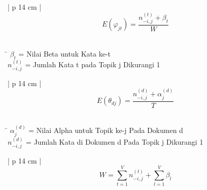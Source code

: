 {
\begin{table}[H]
\small
\centering
\begin{adjustbox}{width=1\textwidth}
\begin{tabular}{| p {14 cm} |}
\hline
{}
\begin{equation}
E(\varphi _{jt})= \dfrac{n_{-i, j}^{(t)}+ \beta_{t}}{W}
\end{equation}\\
\hline
\end{tabular}
\end{adjustbox}
\end{table}

\begin{tabbing}[H]
\= \kill
\small{\hspace{35mm}$\beta_t$ = Nilai Beta untuk Kata ke-t}\\
\small{\hspace{35mm}$n_{-i,j}^{(t)}$ = Jumlah Kata t pada Topik j Dikurangi 1}
\end{tabbing}

\begin{table}[H]
\small
\centering
\begin{adjustbox}{width=1\textwidth}
\begin{tabular}{| p {14 cm} |}
\hline
{}
\begin{equation}
E(\theta _{dj})= \dfrac{n_{-i, j}^{(d)}+ \alpha_{j}^{(d)}}{T}
\end{equation}\\
\hline
\end{tabular}
\end{adjustbox}
\end{table}

\begin{tabbing}[H]
\= \kill
\small{\hspace{30mm}$\alpha_j^{(d)}$ = Nilai Alpha untuk Topik ke-j Pada Dokumen d}\\
\small{\hspace{30mm}$n_{-i,j}^{(d)}$ = Jumlah Kata di Dokumen d Pada Topik j Dikurangi 1}
\end{tabbing}

\begin{table}[H]
\small
\centering
\begin{adjustbox}{width=1\textwidth}
\begin{tabular}{| p {14 cm} |}
\hline
{}
\begin{equation}
W= \sum_{t=1}^{V}{n_{-i, j}^{(t)}} + \sum_{l=1}^{V}{\beta _{l}}
\end{equation}\\
\hline
\end{tabular}
\end{adjustbox}
\end{table}

}

